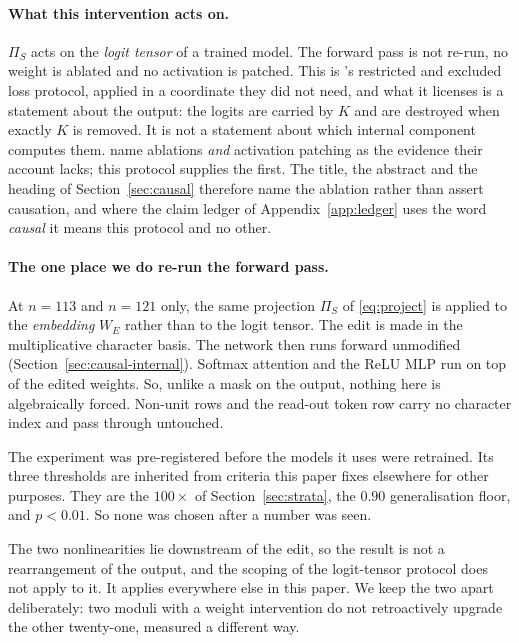 \paragraph{What this intervention acts on.} $\Pi_{S}$ acts on the
\emph{logit tensor} of a trained model. The forward pass is not re-run, no weight is ablated
and no activation is patched. This is \citet{nanda2023progress}'s restricted and excluded
loss protocol, applied in a coordinate they did not need, and what it licenses is a statement
about the output: the logits are carried by $K$ and are destroyed when exactly $K$ is removed.
It is not a statement about which internal component computes them.
\citet{chen2026multiplication} name ablations \emph{and} activation patching as the evidence
their account lacks; this protocol supplies the first. The title, the abstract and the heading
of Section~\ref{sec:causal} therefore name the ablation rather than assert causation, and
where the claim ledger of Appendix~\ref{app:ledger} uses the word \emph{causal} it means this
protocol and no other.

\paragraph{The one place we do re-run the forward pass.}
At $n = 113$ and $n = 121$ only, the same projection $\Pi_{S}$ of \eqref{eq:project} is
applied to the \emph{embedding} $W_{E}$ rather than to the logit tensor. The edit is made in
the multiplicative character basis. The network then runs forward unmodified
(Section~\ref{sec:causal-internal}). Softmax attention and the ReLU MLP run on top of the edited weights. So, unlike a mask on the output, nothing here is
algebraically forced. Non-unit rows and the read-out token row carry no character index and
pass through untouched.

The experiment was pre-registered before the models it uses were retrained. Its three
thresholds are inherited from criteria this paper fixes elsewhere for other purposes. They are
the $100\times$ of Section~\ref{sec:strata}, the $0.90$ generalisation floor, and
$p < 0.01$. So none was chosen after a number was seen.

The two nonlinearities lie downstream of the edit, so the result is not a rearrangement of
the output, and the scoping of the logit-tensor protocol does not apply to it. It applies
everywhere else in this paper. We keep the two apart deliberately: two moduli with a weight
intervention do not retroactively upgrade the other twenty-one, measured a different way.

